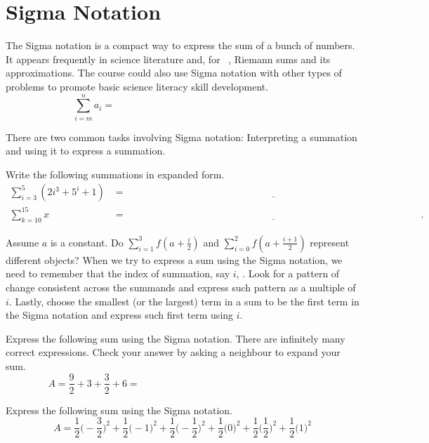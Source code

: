 \documentclass[../main.tex]{subfiles}
\begin{document}
 \section{Sigma Notation}
  The Sigma notation is a compact way to express the sum of a bunch of numbers. It appears frequently in science literature and, for \thecoursesubject~\thecoursenumb, Riemann sums and its approximations. The course could also use Sigma notation with other types of problems to promote basic science literacy skill development.
  {\huge \[ \sum_{i=m}^{n} a_{i} = \hspace{3in}\]}

  There are two common tasks involving Sigma notation: Interpreting a summation and using it to express a summation.
  \begin{example} \label{ex:sigma-notation-read)}
    Write the following summations in expanded form.
    \begin{align*}
      \sum_{i=3}^{5} (2i^{3} + 5^{i} + 1)
      &= \underline{\hspace{5in}} \\[3ex]
      \sum_{k=10}^{15} x
      &= \underline{\hspace{5in}}.
    \end{align*}
  \end{example}
  \faComment{} Assume \(a\) is a constant. Do \(\sum_{i=1}^{3}f\left(a + \frac{i}{2}\right)\) and \(\sum_{i=0}^{2}f\left(a + \frac{i+1}{2}\right)\) represent different objects? 
  \clearpage
  When we try to express a sum using the Sigma notation, we need to remember that the index of summation, say \(i\), . Look for a pattern of change consistent across the summands and express such pattern as a multiple of \(i\).  Lastly, choose the smallest (or the largest) term in a sum to be the first term in the Sigma notation and express such first term using \(i\).

  \begin{example}
    Express the following sum using the Sigma notation. There are infinitely many correct expressions. Check your answer by asking a neighbour to expand your sum.
    \[
      A = \frac{9}{2} + 3 + \frac{3}{2} + 6 = \hspace{3in}
    \]
  \end{example}

  \begin{example}
    Express the following sum using the Sigma notation. 
    \[
      A = \frac{1}{2} \bigg( -\frac{3}{2} \bigg)^{2} + \frac{1}{2} \bigg( -1 \bigg)^{2} + \frac{1}{2} \bigg( -\frac{1}{2} \bigg)^{2} + \frac{1}{2} \bigg( 0 \bigg)^{2} + \frac{1}{2} \bigg( \frac{1}{2} \bigg)^{2} + \frac{1}{2} \bigg( 1 \bigg)^{2}
    \]
  \end{example}
  \vfill
\end{document}
